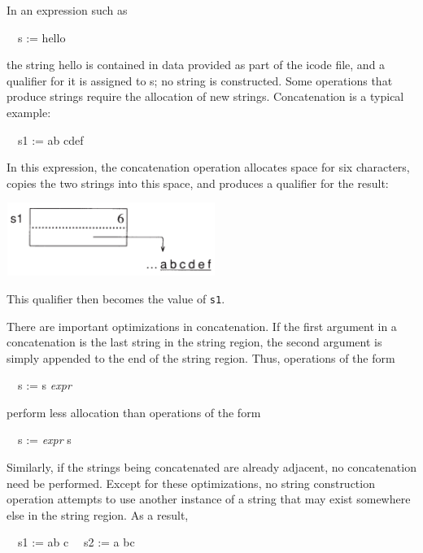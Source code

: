 In an expression such as

{\ttfamily\mdseries
\ \ s := {\textquotedbl}hello{\textquotedbl}}

\noindent the string {\textquotedbl}hello{\textquotedbl} is contained
in data provided as part of the icode file, and a qualifier for it is
assigned to s; no string is constructed. Some operations that produce
strings require the allocation of new strings. Concatenation is a
typical example:

{\ttfamily\mdseries
\ \ s1 := {\textquotedbl}ab{\textquotedbl} {\textbar}{\textbar} {\textquotedbl}cdef{\textquotedbl}}

In this expression, the concatenation operation allocates space for
six characters, copies the two strings into this space, and produces a
qualifier for the result:

\begin{center}
\includegraphics[width=2.6783in,height=0.9366in]{ib-img/ib-img020.png}
\end{center}

This qualifier then becomes the value of \texttt{s1}.

There are important optimizations in concatenation. If the first
argument in a concatenation is the last string in the string region,
the second argument is simply appended to the end of the string
region. Thus, operations of the form

{\ttfamily\mdseries
\ \ s := s {\textbar}{\textbar} \textit{expr}}

\noindent perform less allocation than operations of the form

{\ttfamily\mdseries
\ \ s := \textit{expr }{\textbar}{\textbar} s}

Similarly, if the strings being concatenated are already adjacent, no
concatenation need be performed. Except for these optimizations, no
string construction operation attempts to use another instance of a
string that may exist somewhere else in the string region. As a
result,

{\ttfamily\mdseries
\ \ s1 := {\textquotedbl}ab{\textquotedbl} {\textbar}{\textbar} {\textquotedbl}c{\textquotedbl}\newline
\ \ s2 := {\textquotedbl}a{\textquotedbl} {\textbar}{\textbar} {\textquotedbl}bc{\textquotedbl}}

